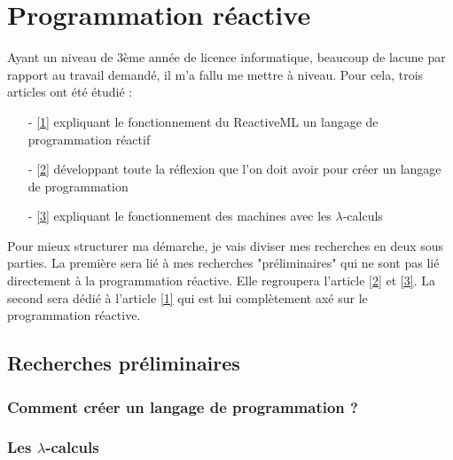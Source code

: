 \documentclass[10pt,a4paper]{article}
\begin{document}
		
	
	\section{Programmation réactive}
	 
	 Ayant un niveau de 3ème année de licence informatique, beaucoup de lacune par rapport au travail demandé, il m'a fallu me mettre à niveau. Pour cela, trois articles ont été étudié : 
	 \begin{enumerate}
	 	\item[-] \hyperref[ReactiveML]{[1]} expliquant le fonctionnement du ReactiveML un langage de programmation réactif
	 	\item[-] \hyperref[ZINC]{[2]} développant toute la réflexion que l'on doit avoir pour créer un langage de programmation
	 	\item[-] \hyperref[Calculi]{[3]} expliquant le fonctionnement des machines avec les $\lambda$-calculs
	 \end{enumerate}
 	 Pour mieux structurer ma démarche, je vais diviser mes recherches en deux sous parties. La première sera lié à mes recherches "préliminaires" qui ne sont pas lié directement à la programmation réactive. Elle regroupera l'article \hyperref[ZINC]{[2]} et \hyperref[Calculi]{[3]}. La second sera dédié à l'article \hyperref[ReactiveML]{[1]} qui est lui complètement axé sur le programmation réactive. 
	 
		\subsection{Recherches préliminaires}
			
			\subsubsection{Comment créer un langage de programmation ?}
	
			\subsubsection{Les  $\lambda$-calculs}
			
\end{document}
